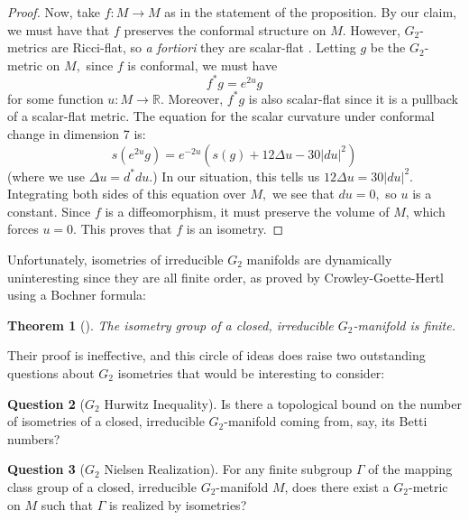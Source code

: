 \documentclass{amsart}
\theoremstyle{theorem}
\newtheorem{theorem}{Theorem}[section]
\theoremstyle{definition}
\theoremstyle{definition}
\theoremstyle{definition}
\theoremstyle{theorem}
\theoremstyle{theorem}
\theoremstyle{theorem}
\theoremstyle{corollary}
\theoremstyle{question}
\newtheorem{question}[theorem]{Question}
\theoremstyle{remark}
\begin{document}
\begin{proof}
    Now, take $f:M\to M$ as in the statement of the proposition. By our claim, we must have that $f$ preserves the conformal structure on $M.$ However, $G_2$-metrics are Ricci-flat, so \emph{a fortiori} they are scalar-flat \cite{Bonan}. Letting $g$ be the $G_2$-metric on $M,$ since $f$ is conformal, we must have $$f^*g = e^{2u}g$$ for some function $u:M\to\mathbb{R}.$ Moreover, $f^*g$ is also scalar-flat since it is a pullback of a scalar-flat metric. The equation for the scalar curvature under conformal change in dimension 7 is: $$s(e^{2u}g) = e^{-2u}\left(s(g) + 12\Delta u-30|du|^2\right)$$ (where we use $\Delta u = d^*du.$) In our situation, this tells us $12\Delta u = 30 |du|^2.$ Integrating both sides of this equation over $M,$ we see that $du = 0,$ so $u$ is a constant. Since $f$ is a diffeomorphism, it must preserve the volume of $M$, which forces $u = 0.$ This proves that $f$ is an isometry.
\end{proof}

Unfortunately, isometries of irreducible $G_2$ manifolds are dynamically uninteresting since they are all finite order, as proved by Crowley-Goette-Hertl using a Bochner formula:

\begin{theorem}[{\cite[Lemma 2.1]{CGH}}]
    The isometry group of a closed, irreducible $G_2$-manifold is finite.
\end{theorem}

Their proof is ineffective, and this circle of ideas does raise two outstanding questions about $G_2$ isometries that would be interesting to consider:

\begin{question}[$G_2$ Hurwitz Inequality]
    Is there a topological bound on the number of isometries of a closed, irreducible $G_2$-manifold coming from, say, its Betti numbers? 
\end{question}

\begin{question}[$G_2$ Nielsen Realization]
    For any finite subgroup $\Gamma$ of the mapping class group of a closed, irreducible $G_2$-manifold $M$, does there exist a $G_2$-metric on $M$ such that $\Gamma$ is realized by isometries?
\end{question}









\end{document}
